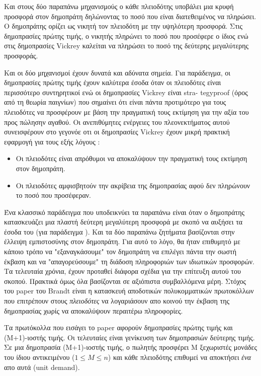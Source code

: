 \documentclass[letterpaper,11pt]{article}
\begin{document}
Και στους δύο παραπάνω μηχανισμούς ο κάθε πλειοδότης υποβάλει μια κρυφή προσφορά στον δημοπράτη δηλώνοντας το
ποσό που είναι διατεθειμένος να πληρώσει. Ο δημοπράτης ορίζει ως νικητή τον πλειοδότη με την υψηλότερη
προσφορά. Στις δημοπρασίες πρώτης τιμής, ο νικητής πληρώνει το ποσό που προσέφερε ο ίδιος ενώ στις δημοπρασίες
Vickrey καλείται να πληρώσει το ποσό της δεύτερης μεγαλύτερης προσφοράς.

Και οι δύο μηχανισμοί έχουν δυνατά και αδύνατα σημεία. Για παράδειγμα, οι δημοπρασίες πρώτης τιμής έχουν
καλύτερα έσοδα όταν οι πλειοδότες είναι περισσότερο συντηρητικοί ενώ οι δημοπρασίες Vickrey είναι
stra- tegyproof (όρος από τη θεωρία παιγνίων) που σημαίνει ότι είναι πάντα προτιμότερο για τους πλειοδότες να
προσφέρουν με βάση την πραγματική τους εκτίμηση για την αξία του προς πώλησην αγαθού. Οι ανεπιθύμητες
ενέργειες του πλεονεκτήματος αυτού συνεισφέρουν στο γεγονόε οτι οι δημοπρασίες Vickrey έχουν μικρή πρακτική
εφαρμογή για τους εξής λόγους \cite{RH, RTK, Sandholm}:

\begin{itemize}
	\item Οι πλειοδότες είναι απρόθυμοι να αποκαλύψουν την πραγματική τους εκτίμηση στον δημοπράτη. 
	\item Οι πλειοδότες αμφισβητούν την ακρίβεια της δημοπρασίας αφού δεν πληρώνουν το ποσό που προσέφεραν.
\end{itemize}

Ένα κλασσικό παράδειγμα που υποδεικνύει τα παραπάνω είναι όταν ο δημοπράτης κατασκευάζει μια πλαστή δεύτερη
μεγαλύτερη προσφορά με σκοπό να αυξήσει τα έσοδα του (για παράδειγμα \cite{PS}). Και τα δύο παραπάνω ζητήματα βασίζονται στην έλλειψη
εμπιστοσύνης στον δημοπράτη. Για αυτό το λόγο, θα ήταν επιθυμητό με κάποιο τρόπο να "εξαναγκάσουμε" τον
δημοπράτη να επιλέγει πάντα την σωστή έκβαση και να "απαγορεύσουμε" τη διάδοση πληροφοριών των ιδιωτικών
προσφορών. Τα τελευταία χρόνια, έχουν προταθεί διάφορα σχέδια για την επίτευξη αυτού του σκοπού. Πρακτικά όμως
όλα βασίζονται σε αξιόπιστα συμβαλλόμενα μέρη. Στόχος του paper του Brandt είναι η κατασκευή αποδοτικών
πολυκομματικών πρωτοκόλλων που επιτρέπουν στους \emph{πλειοδότες} να λογαριάσουν απο κοινού την έκβαση της
δημοπρασίας χωρίς να αποκαλύψουν περαιτέρω πληροφορίες.

Τα πρωτόκολλα που εισάγει το paper αφορούν δημοπρασίες πρώτης τιμής και (Μ+1)-ιοστής τιμής. Οι τελευταίες
είναι γενίκευση των δημοπρασιών δεύτερης τιμής. Σε μια δημοπρασία (Μ+1)-ιοστής τιμής, ο πωλητής προσφέρει Μ ξεχωριστές μονάδες
του ίδιου αντικειμένου ($1 \leq M \leq n$) και κάθε πλειοδότης επιθυμεί να αποκτήσει \emph{ένα} απο αυτά (unit demand). 
\end{document}
